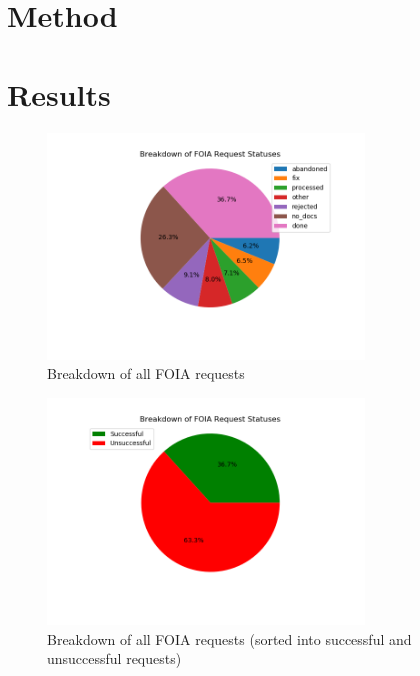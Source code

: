 \documentclass{article}
\begin{document}
	\section{Method}
	
	
	\section{Results}
	
		\begin{figure}[H]
			\centering
			\includegraphics[width=0.75\textwidth]{statuses}
			\caption{Breakdown of all FOIA requests}
			\label{fig:statuses}
		\end{figure}
	
		\begin{figure}[H]
			\centering
			\includegraphics[width=0.75\textwidth]{statuses_simple}
			\caption{Breakdown of all FOIA requests (sorted into successful and unsuccessful requests)}
			\label{fig:statuses_simple}
		\end{figure}
	
\end{document}
